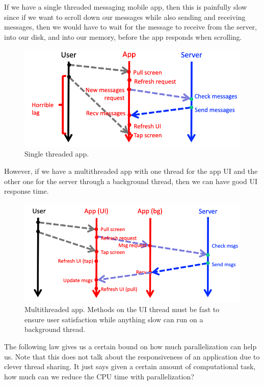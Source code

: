 \documentclass{article}
\begin{document}
    \begin{example}
      If we have a single threaded messaging mobile app, then this is painfully slow since if we want to scroll down our messages while also sending and receiving messages, then we would have to wait for the message to receive from the server, into our disk, and into our memory, before the app responds when scrolling. 
      \begin{figure}[H]
        \centering 
        \includegraphics[scale=0.4]{img/single_threaded_app.png}
        \caption{Single threaded app.} 
        \label{fig:single_threaded_app}
      \end{figure}
      However, if we have a multithreaded app with one thread for the app UI and the other one for the server through a background thread, then we can have good UI response time. 
      \begin{figure}[H]
        \centering 
        \includegraphics[scale=0.4]{img/multithreaded_app.png}
        \caption{Multithreaded app. Methods on the UI thread must be fast to ensure user satisfaction while anything slow can run on a background thread. } 
        \label{fig:multithreaded_app}
      \end{figure}
    \end{example}

    The following law gives us a certain bound on how much parallelization can help us. Note that this does not talk about the responsiveness of an application due to clever thread sharing. It just says given a certain amount of computational task, how much can we reduce the CPU time with parallelization? 
\end{document}
